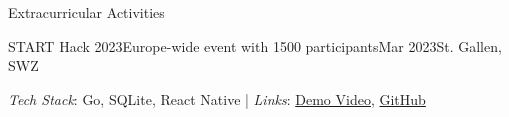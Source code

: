 \documentclass{kyvernitis-resume}
\begin{document}
\begin{section}{Extracurricular Activities}
\begin{subsection}{START Hack 2023}{Europe-wide event with 1500 participants}{Mar 2023}{St. Gallen, SWZ}
        \end{subsection}
        \textit{Tech Stack}: Go, SQLite, React Native \hspace{0.1cm} | \hspace{0.1cm}
        \textit{Links}: \href{https://www.youtube.com/watch?v=rgmPpHwMYXU}{Demo Video}, \href{https://github.com/4rneee/STARTHack23-sunrise-backend}{GitHub}
        










\end{section}
\end{document}
